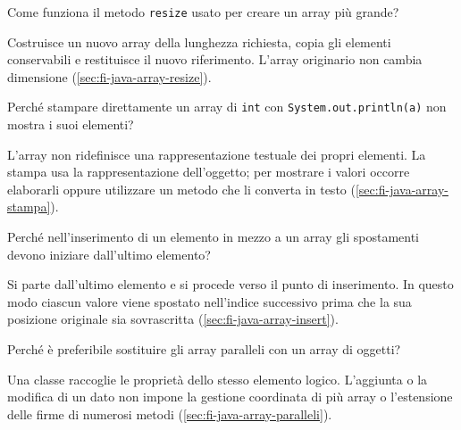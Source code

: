 \begin{exercise}
\label{ex:fi-esercizi-array-ridimensionamento}
Come funziona il metodo \texttt{resize} usato per creare un
array più grande?
\end{exercise}

Costruisce un nuovo array della lunghezza richiesta, copia
gli elementi conservabili e restituisce il nuovo riferimento.
L'array originario non cambia dimensione
(\cref{sec:fi-java-array-resize}).

\begin{exercise}
\label{ex:fi-esercizi-array-stampa}
Perché stampare direttamente un array di \texttt{int} con
\texttt{System.out.println(a)} non mostra i suoi elementi?
\end{exercise}

L'array non ridefinisce una rappresentazione testuale dei propri
elementi. La stampa usa la rappresentazione dell'oggetto;
per mostrare i valori occorre elaborarli oppure utilizzare
un metodo che li converta in testo
(\cref{sec:fi-java-array-stampa}).

\begin{exercise}
\label{ex:fi-esercizi-array-inserimento}
Perché nell'inserimento di un elemento in mezzo a un array
gli spostamenti devono iniziare dall'ultimo elemento?
\end{exercise}

Si parte dall'ultimo elemento e si procede verso il punto di
inserimento. In questo modo ciascun valore viene spostato
nell'indice successivo prima che la sua posizione originale
sia sovrascritta (\cref{sec:fi-java-array-insert}).

\begin{exercise}
\label{ex:fi-esercizi-array-paralleli}
Perché è preferibile sostituire gli array paralleli con un
array di oggetti?
\end{exercise}

Una classe raccoglie le proprietà dello stesso elemento logico.
L'aggiunta o la modifica di un dato non impone la gestione
coordinata di più array o l'estensione delle firme di numerosi
metodi (\cref{sec:fi-java-array-paralleli}).
